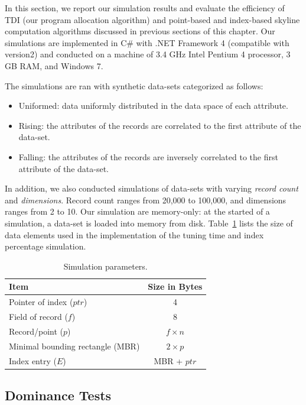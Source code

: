 In this section, we report our simulation results and evaluate the efficiency of TDI (our program allocation algorithm) and point-based and index-based skyline computation algorithms discussed in previous sections of this chapter. Our simulations are implemented in C\# with .NET Framework 4 (compatible with version2) and conducted on a machine of 3.4 GHz Intel Pentium 4 processor, 3 GB RAM, and Windows 7.

The simulations are ran with synthetic data-sets categorized as follows:

\begin{itemize}
\item Uniformed: data uniformly distributed in the data space of each
    attribute.
\item Rising: the attributes of the records are correlated to the first
    attribute of the data-set.
\item Falling: the attributes of the records are inversely correlated to
    the first attribute of the data-set.
\end{itemize}

In addition, we also conducted simulations of data-sets with varying \emph{record count} and \emph{dimensions}.  Record count ranges from 20,000 to 100,000, and dimensions ranges from 2 to 10. Our simulation are memory-only: at the started of a simulation, a data-set is loaded into memory from disk. Table~\ref{tab:sim_size} lists the size of data elements used in the implementation of the tuning time and index percentage simulation.

\begin{table}[h]
\caption{Simulation parameters.}
\label{tab:sim_size}
\centering
\begin{tabular}{l|c}
\hline
{\bf Item} & {\bf Size in Bytes}\\
\hline
Pointer of index ($ptr$) & 4\\
Field of record ($f$) & 8\\
Record/point ($p$) & $f \times n$\\
Minimal bounding rectangle (MBR) & $2 \times p$\\
Index entry ($E$) & MBR + $ptr$\\
\hline
\end{tabular}
\end{table}

\subsection{Dominance Tests}\label{sec:exp_dom_test}

